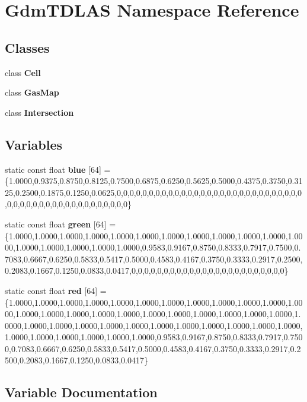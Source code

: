 \section{GdmTDLAS Namespace Reference}
\label{namespaceGdmTDLAS}
\subsection*{Classes}
\begin{DoxyCompactItemize}
\item 
class {\bf Cell}
\item 
class {\bf GasMap}
\item 
class {\bf Intersection}
\end{DoxyCompactItemize}
\subsection*{Variables}
\begin{DoxyCompactItemize}
\item 
static const float {\bf blue} [64] = \{1.0000,0.9375,0.8750,0.8125,0.7500,0.6875,0.6250,0.5625,0.5000,0.4375,0.3750,0.3125,0.2500,0.1875,0.1250,0.0625,0,0,0,0,0,0,0,0,0,0,0,0,0,0,0,0,0,0,0,0,0,0,0,0,0,0,0,0,0,0,0,0,0,0,0,0,0,0,0,0,0,0,0,0,0,0,0,0\}
\item 
static const float {\bf green} [64] = \{1.0000,1.0000,1.0000,1.0000,1.0000,1.0000,1.0000,1.0000,1.0000,1.0000,1.0000,1.0000,1.0000,1.0000,1.0000,1.0000,1.0000,0.9583,0.9167,0.8750,0.8333,0.7917,0.7500,0.7083,0.6667,0.6250,0.5833,0.5417,0.5000,0.4583,0.4167,0.3750,0.3333,0.2917,0.2500,0.2083,0.1667,0.1250,0.0833,0.0417,0,0,0,0,0,0,0,0,0,0,0,0,0,0,0,0,0,0,0,0,0,0,0,0\}
\item 
static const float {\bf red} [64] = \{1.0000,1.0000,1.0000,1.0000,1.0000,1.0000,1.0000,1.0000,1.0000,1.0000,1.0000,1.0000,1.0000,1.0000,1.0000,1.0000,1.0000,1.0000,1.0000,1.0000,1.0000,1.0000,1.0000,1.0000,1.0000,1.0000,1.0000,1.0000,1.0000,1.0000,1.0000,1.0000,1.0000,1.0000,1.0000,1.0000,1.0000,1.0000,1.0000,1.0000,1.0000,0.9583,0.9167,0.8750,0.8333,0.7917,0.7500,0.7083,0.6667,0.6250,0.5833,0.5417,0.5000,0.4583,0.4167,0.3750,0.3333,0.2917,0.2500,0.2083,0.1667,0.1250,0.0833,0.0417\}
\end{DoxyCompactItemize}


\subsection{Variable Documentation}
